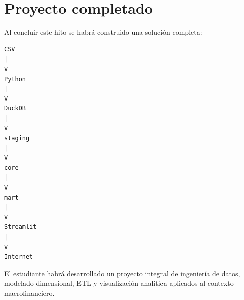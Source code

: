 \section{Proyecto completado}

Al concluir este hito se habrá construido una solución completa:

\begin{verbatim}
CSV
|
V
Python
|
V
DuckDB
|
V
staging
|
V
core
|
V
mart
|
V
Streamlit
|
V
Internet
\end{verbatim}

El estudiante habrá desarrollado un proyecto integral de ingeniería de datos, modelado dimensional, ETL y visualización analítica aplicados al contexto macrofinanciero.
